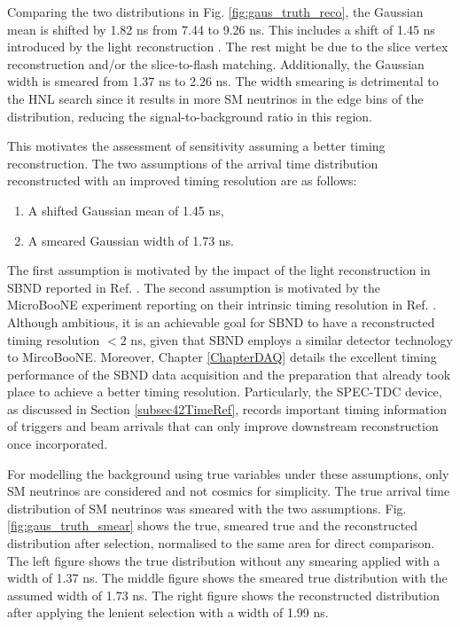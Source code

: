 
Comparing the two distributions in Fig. \ref{fig:gaus_truth_reco}, the Gaussian mean is shifted by 1.82 ns from 7.44 to 9.26 ns.
This includes a shift of 1.45 ns introduced by the light reconstruction \cite{sbnd_pds_paper}.
The rest might be due to the slice vertex reconstruction and/or the slice-to-flash matching.      
Additionally, the Gaussian width is smeared from 1.37 ns to 2.26 ns. 
The width smearing is detrimental to the HNL search since it results in more SM neutrinos in the edge bins of the distribution, reducing the signal-to-background ratio in this region.  

This motivates the assessment of sensitivity assuming a better timing reconstruction.
The two assumptions of the arrival time distribution reconstructed with an improved timing resolution are as follows:
\begin{enumerate}
    \item A shifted Gaussian mean of 1.45 ns,
    \item A smeared Gaussian width of 1.73 ns.
\end{enumerate}
The first assumption is motivated by the impact of the light reconstruction in SBND reported in Ref. \cite{sbnd_pds_paper}.
The second assumption is motivated by the MicroBooNE experiment reporting on their intrinsic timing resolution in Ref. \cite{uboone_ns}.
Although ambitious, it is an achievable goal for SBND to have a reconstructed timing resolution $< 2$ ns, given that SBND employs a similar detector technology to MircoBooNE.
Moreover, Chapter \ref{ChapterDAQ} details the excellent timing performance of the SBND data acquisition and the preparation that already took place to achieve a better timing resolution.
Particularly, the SPEC-TDC device, as discussed in Section \ref{subsec42TimeRef}, records important timing information of triggers and beam arrivals that can only improve downstream reconstruction once incorporated. 

For modelling the background using true variables under these assumptions, only SM neutrinos are considered and not cosmics for simplicity. 
The true arrival time distribution of SM neutrinos was smeared with the two assumptions.
Fig. \ref{fig:gaus_truth_smear} shows the true, smeared true and the reconstructed distribution after selection, normalised to the same area for direct comparison.
The left figure shows the true distribution without any smearing applied with a width of 1.37 ns.
The middle figure shows the smeared true distribution with the assumed width of 1.73 ns.
The right figure shows the reconstructed distribution after applying the lenient selection with a width of 1.99 ns.


